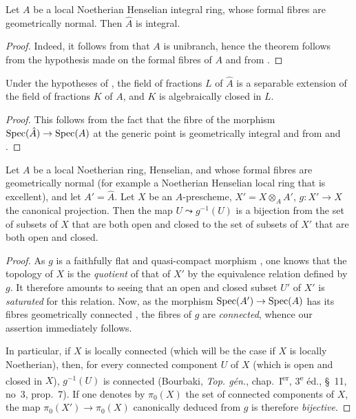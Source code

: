 \begin{corollary}[18.9.2]
\label{IV.18.9.2}
Let $A$ be a local Noetherian Henselian integral ring, whose formal fibres are geometrically normal.
Then $\hat{A}$ is integral.
\end{corollary}

\begin{proof}
Indeed, it follows from  that $A$ is unibranch, hence the theorem follows from the hypothesis made on the formal fibres of $A$ and from .
\end{proof}

\begin{corollary}[18.9.3]
\label{IV.18.9.3}
Under the hypotheses of , the field of fractions $L$ of $\hat{A}$ is a separable extension of the field of fractions $K$ of $A$, and $K$ is algebraically closed in $L$.
\end{corollary}

\begin{proof}
This follows from the fact that the fibre of the morphism $\operatorname{Spec}(\hat{A})\to\operatorname{Spec}(A)$ at the generic point is geometrically integral and from  and .
\end{proof}

\begin{corollary}[18.9.4]
\label{IV.18.9.4}
Let $A$ be a local Noetherian ring, Henselian, and whose formal fibres are geometrically normal \textup{(for example a Noetherian Henselian local ring that is} excellent\textup{)}, and let $A'=\hat{A}$.
Let $X$ be an $A$-prescheme, $X'=X\otimes_{A}A'$, $g:X'\to X$ the canonical projection.
Then the map $U\leadsto g^{-1}(U)$ is a bijection from the set of subsets of $X$ that are both open and closed to the set of subsets of $X'$ that are both open and closed.
\end{corollary}

\begin{proof}
As $g$ is a faithfully flat and quasi-compact morphism , one knows that the topology of $X$ is the \emph{quotient} of that of $X'$ by the equivalence relation defined by $g$.
It therefore amounts to seeing that an open and closed subset $U'$ of $X'$ is \emph{saturated} for this relation.
Now, as the morphism $\operatorname{Spec}(A')\to\operatorname{Spec}(A)$ has its fibres geometrically connected , the fibres of $g$ are \emph{connected}, whence our assertion immediately follows.

In particular, if $X$ is locally connected (which will be the case if $X$ is locally Noetherian), then, for every connected component $U$ of $X$ (which is open and closed
in $X$), $g^{-1}(U)$ is connected (Bourbaki, \emph{Top. g\'{e}n.}, chap.~I\textsuperscript{er}, 3\textsuperscript{e} \'{e}d., \S~11, no~3, prop.~7).
If one denotes by $\pi_0(X)$ the set of connected components of $X$, the map $\pi_0(X')\to\pi_0(X)$ canonically deduced from $g$ is therefore \emph{bijective}.
\end{proof}

